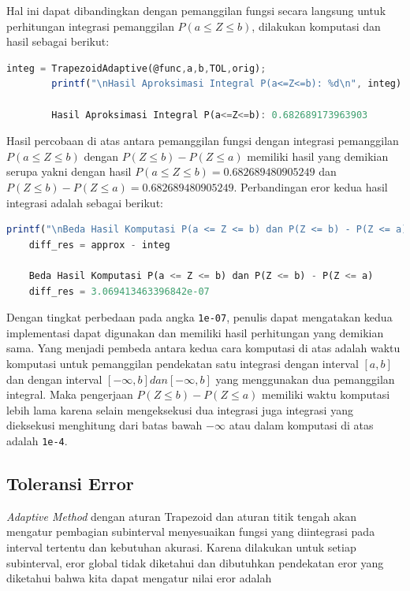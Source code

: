 \documentclass[journal,12pt,onecolumn,a4paper]{IEEEtran}
\begin{document}
Hal ini dapat dibandingkan dengan pemanggilan fungsi secara langsung untuk perhitungan integrasi pemanggilan \(P(a \le Z \le b)\), dilakukan komputasi dan hasil sebagai berikut:
\begin{center}
	\begin{lstlisting}[language=Octave]
		integ = TrapezoidAdaptive(@func,a,b,TOL,orig);
		printf("\nHasil Aproksimasi Integral P(a<=Z<=b): %d\n", integ)

		Hasil Aproksimasi Integral P(a<=Z<=b): 0.682689173963903
	\end{lstlisting}
\end{center}

Hasil percobaan di atas antara pemanggilan fungsi dengan integrasi pemanggilan \(P(a \le Z \le b)\) dengan \(P(Z \le b ) - P(Z \le a )\) memiliki hasil yang demikian serupa yakni dengan hasil \(P(a \le Z \le b)= 0.682689480905249\)  dan \(P(Z \le b ) - P(Z \le a ) = 0.682689480905249\). Perbandingan eror kedua hasil integrasi adalah sebagai berikut:

\begin{center}
	\begin{lstlisting}[language=Octave]
	printf("\nBeda Hasil Komputasi P(a <= Z <= b) dan P(Z <= b) - P(Z <= a)\n")
	diff_res = approx - integ

	Beda Hasil Komputasi P(a <= Z <= b) dan P(Z <= b) - P(Z <= a)
	diff_res = 3.069413463396842e-07
	\end{lstlisting}
\end{center}

Dengan tingkat perbedaan pada angka \lstinline{1e-07}, penulis dapat mengatakan kedua implementasi dapat digunakan dan memiliki hasil perhitungan yang demikian sama. Yang menjadi pembeda antara kedua cara komputasi di atas adalah waktu komputasi untuk pemanggilan pendekatan satu integrasi dengan interval \([a,b]\) dan dengan interval \([-\infty,b] dan [-\infty,b]\) yang menggunakan dua pemanggilan integral. Maka pengerjaan \(P(Z \le b ) - P(Z \le a )\) memiliki waktu komputasi lebih lama karena selain mengeksekusi dua integrasi juga integrasi yang dieksekusi menghitung dari batas bawah \(-\infty\) atau dalam komputasi di atas adalah \lstinline{1e-4}.

\subsection{Toleransi Error}

\emph{Adaptive Method} dengan aturan Trapezoid dan aturan titik tengah akan mengatur pembagian subinterval menyesuaikan fungsi yang diintegrasi pada interval tertentu dan kebutuhan akurasi. Karena dilakukan untuk setiap subinterval, eror global tidak diketahui dan dibutuhkan pendekatan eror yang diketahui bahwa kita dapat mengatur nilai eror adalah
\end{document}

